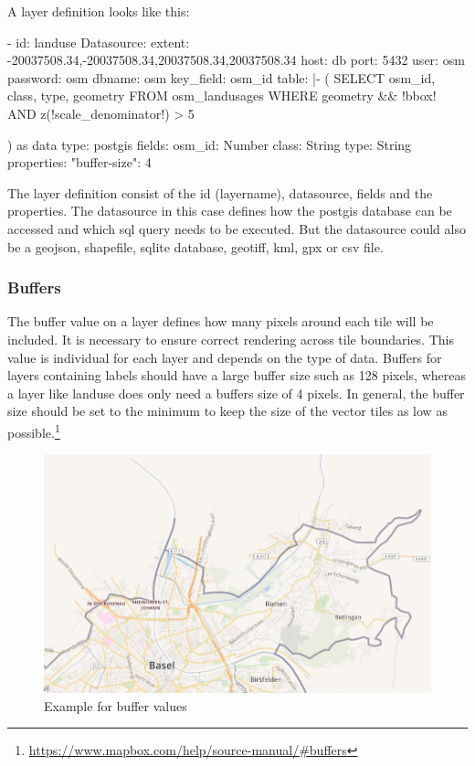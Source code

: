 A layer definition looks like this:
\begin{yamlcode}
- id: landuse
Datasource:
    extent: -20037508.34,-20037508.34,20037508.34,20037508.34
    host: db
    port: 5432
    user: osm
    password: osm
    dbname: osm
    key_field: osm_id
    table: |-
        (
            SELECT osm_id, class, type, geometry
            FROM osm_landusages
            WHERE geometry && !bbox!
            AND z(!scale_denominator!) > 5
        
        ) as data
    type: postgis
fields:
    osm_id: Number
    class: String
    type: String
properties:
    "buffer-size": 4
\end{yamlcode}
The layer definition consist of the id (layername), datasource, fields and the properties. The datasource in this case defines how the postgis database can be accessed and which sql query needs to be executed. But the datasource could also be a geojson, shapefile, sqlite database, geotiff, kml, gpx or csv file.

\subsubsection{Buffers}\label{buffers}
The buffer value on a layer defines how many pixels around each tile will be included. It is necessary to ensure correct rendering across tile boundaries. This value is individual for each layer and depends on the type of data. Buffers for layers containing labels should have a large buffer size such as 128 pixels, whereas a layer like landuse does only need a buffers size of 4 pixels. In general, the buffer size should be set to the minimum to keep the size of the vector tiles as low as possible.\footnote{\url{https://www.mapbox.com/help/source-manual/\#buffers}}

\begin{figure}[h]
  \centering
  \includegraphics[width=1\textwidth]{images/buffer.png}
  \caption{Example for buffer values}
\end{figure}


